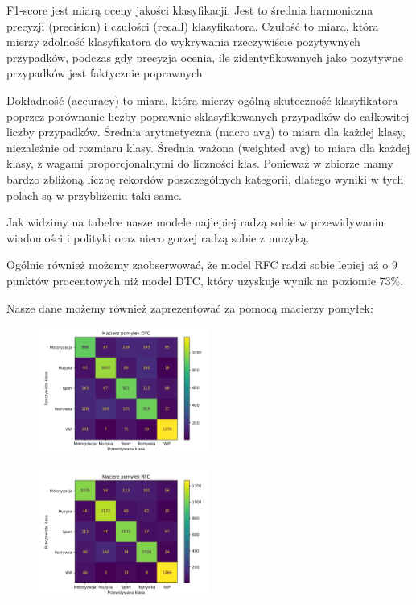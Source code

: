F1-score jest miarą oceny jakości klasyfikacji. Jest to średnia harmoniczna precyzji (precision) i czułości (recall) klasyfikatora. Czułość to miara, która mierzy zdolność klasyfikatora do wykrywania rzeczywiście pozytywnych przypadków, podczas gdy precyzja ocenia, ile zidentyfikowanych jako pozytywne przypadków jest faktycznie poprawnych.

Dokładność (accuracy) to miara, która mierzy ogólną skuteczność klasyfikatora poprzez porównanie liczby poprawnie sklasyfikowanych przypadków do całkowitej liczby przypadków. Średnia arytmetyczna (macro avg) to miara dla każdej klasy, niezależnie od rozmiaru klasy. Średnia ważona (weighted avg) to miara dla każdej klasy, z wagami proporcjonalnymi do liczności klas. Ponieważ w zbiorze mamy bardzo zbliżoną liczbę rekordów poszczególnych kategorii, dlatego wyniki w tych polach są w przybliżeniu taki same.

Jak widzimy na tabelce nasze modele najlepiej radzą sobie w przewidywaniu wiadomości i polityki oraz nieco gorzej radzą sobie z muzyką.

Ogólnie również możemy zaobserwować, że model RFC radzi sobie lepiej aż o 9 punktów procentowych niż model DTC, który uzyskuje wynik na poziomie 73\%.

Nasze dane możemy również zaprezentować za pomocą macierzy pomyłek: 

\begin{figure}[H]
    \centering
    \includegraphics[width=0.5\textwidth]{Images/klasyfikacja DTC.png}
    \label{fig:DTC}
\end{figure}

\begin{figure}[H]
    \centering
    \includegraphics[width=0.5\textwidth]{Images/klasyfikacja RFC.png}
    \label{fig:RFC}
\end{figure}

